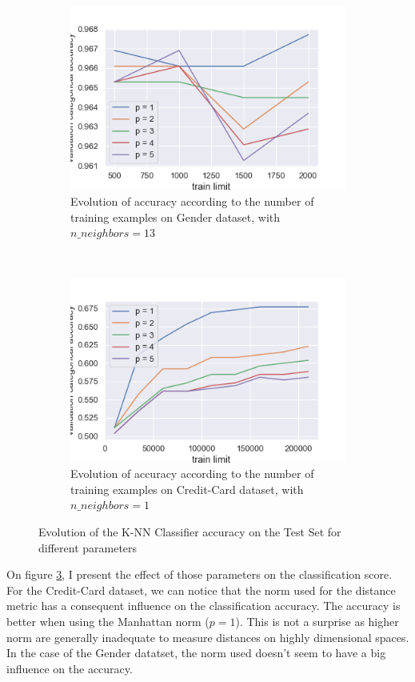\documentclass[10pt]{article}
\begin{document}
\begin{figure}
\begin{subfigure}[]{0.45\columnwidth}
				\centering
				\includegraphics[width=\linewidth]{../graphics/knn_gender_train_limit.png}
				\caption{Evolution of accuracy according to the number of training examples on Gender dataset, with $n\_neighbors = 13$}
				\label{knn:g_train_limit}
			\end{subfigure}
			~
			\begin{subfigure}[]{0.45\columnwidth}
				\centering
				\includegraphics[width=\linewidth]{../graphics/knn_creditcard_train_limit.png}
				\caption{Evolution of accuracy according to the number of training examples on Credit-Card dataset, with $n\_neighbors = 1$}
				\label{knn:cc_train_limit}
			\end{subfigure}
			\caption{Evolution of the K-NN Classifier accuracy on the Test Set for different parameters}
			\label{knn:knn}
		\end{figure}

		On figure \ref{knn:knn}, I present the effect of those parameters on the classification score.
		For the Credit-Card dataset, we can notice that the norm used for the distance metric has a consequent influence on the classification accuracy. The accuracy is better when using the Manhattan norm ($p = 1$). This is not a surprise as higher norm are generally inadequate to measure distances on highly dimensional spaces. In the case of the Gender datatset, the norm used doesn't seem to have a big influence on the accuracy.
\end{document}
